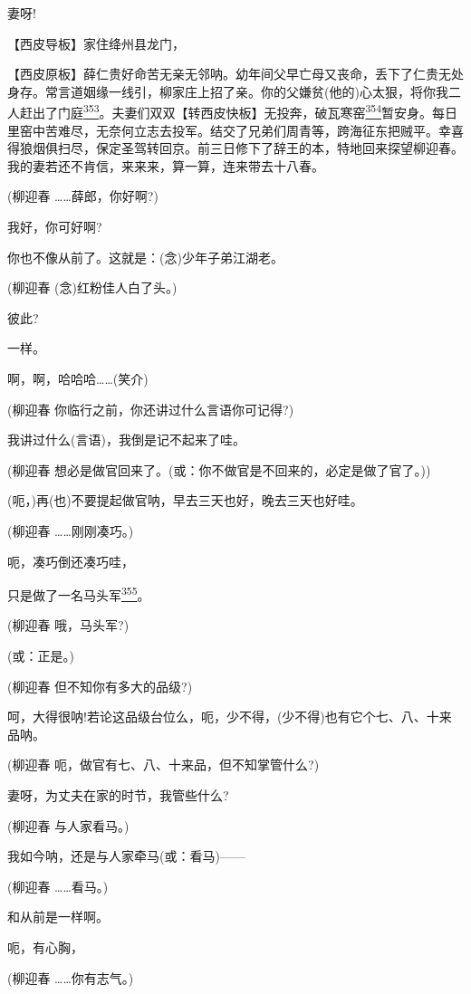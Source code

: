 妻呀!

【西皮导板】家住绛州县龙门，

【西皮原板】薛仁贵好命苦无亲无邻呐。幼年间父早亡母又丧命，丢下了仁贵无处身存。常言道姻缘一线引，柳家庄上招了亲。你的父嫌贫(他的)心太狠，将你我二人赶出了门庭\protect\hyperlink{fn353}{\textsuperscript{353}}。夫妻们双双【转西皮快板】无投奔，破瓦寒窑\protect\hyperlink{fn354}{\textsuperscript{354}}暂安身。每日里窑中苦难尽，无奈何立志去投军。结交了兄弟们周青等，跨海征东把贼平。幸喜得狼烟俱扫尽，保定圣驾转回京。前三日修下了辞王的本，特地回来探望柳迎春。我的妻若还不肯信，来来来，算一算，连来带去十八春。

(柳迎春 \ldots{}\ldots{}薛郎，你好啊?)

我好，你可好啊?

你也不像从前了。这就是：(念)少年子弟江湖老。

(柳迎春 (念)红粉佳人白了头。)

彼此?

一样。

啊，啊，哈哈哈\ldots{}\ldots{}(笑介)

(柳迎春 你临行之前，你还讲过什么言语你可记得?)

我讲过什么(言语)，我倒是记不起来了哇。

(柳迎春 想必是做官回来了。(或：你不做官是不回来的，必定是做了官了。))

(呃，)再(也)不要提起做官呐，早去三天也好，晚去三天也好哇。

(柳迎春 \ldots{}\ldots{}刚刚凑巧。)

呃，凑巧倒还凑巧哇，

只是做了一名马头军\protect\hyperlink{fn355}{\textsuperscript{355}}。

(柳迎春 哦，马头军?)

(或：正是。)

(柳迎春 但不知你有多大的品级?)

呵，大得很呐!若论这品级台位么，呃，少不得，(少不得)也有它个七、八、十来品呐。

(柳迎春 呃，做官有七、八、十来品，但不知掌管什么?)

妻呀，为丈夫在家的时节，我管些什么?

(柳迎春 与人家看马。)

我如今呐，还是与人家牵马(或：看马)------

(柳迎春 \ldots{}\ldots{}看马。)

和从前是一样啊。

呃，有心胸，

(柳迎春 \ldots{}\ldots{}你有志气。)


